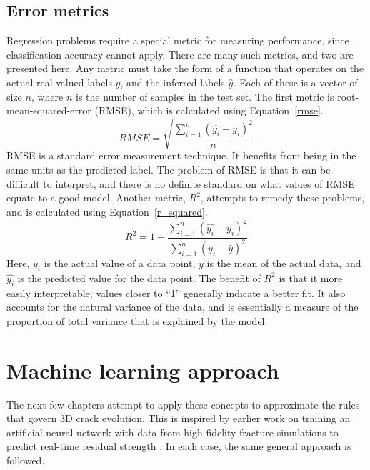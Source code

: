\subsection{Error metrics}
Regression problems require a special metric for measuring performance, since classification accuracy cannot apply.  There are many such metrics, and two are presented here.  Any metric must take the form of a function that operates on the actual real-valued labels $y$, and the inferred labels $\hat{y}$.  Each of these is a vector of size $n$, where $n$ is the number of samples in the test set.  The first metric is root-mean-squared-error (RMSE), which is calculated using Equation~\ref{rmse}.
%
\begin{equation}
RMSE = \sqrt{\frac{\sum_{i=1}^n (\hat{y_i} - y_i)^2}{n}}
\label{rmse}
\end{equation}
%
RMSE is a standard error measurement technique.  It benefits from being in the same units as the predicted label.  The problem of RMSE is that it can be difficult to interpret, and there is no definite standard on what values of RMSE equate to a good model.  Another metric, $R^2$, attempts to remedy these problems, and is calculated using Equation~\ref{r_squared}.
%
\begin{equation}
R^2 = 1 - \frac{\sum_{i=1}^n (\hat{y_i} - y_i)^2}{\sum_{i=1}^n (y_i - \bar{y})^2}
\label{r_squared}
\end{equation}
%
Here, $y_i$ is the actual value of a data point, $\bar{y}$ is the mean of the actual data, and $\hat{y_i}$ is the predicted value for the data point.  The benefit of $R^2$ is that it more easily interpretable; values closer to ``1'' generally indicate a better fit.  It also accounts for the natural variance of the data, and is essentially a measure of the proportion of total variance that is explained by the model.

\section{Machine learning approach}
The next few chapters attempt to apply these concepts to approximate the rules that govern 3D crack evolution.  This is inspired by earlier work on training an artificial neural network with data from high-fidelity fracture simulations to predict real-time residual strength \cite{spear2011}.  In each case, the same general approach is followed.

